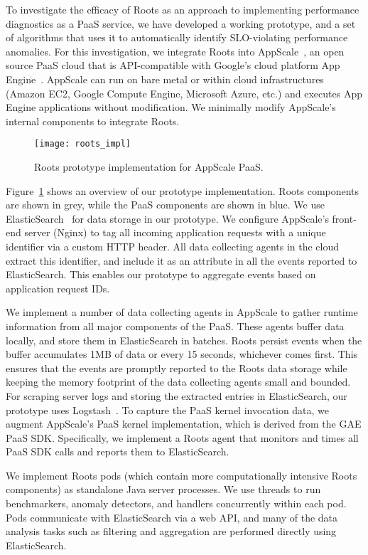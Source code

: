 To investigate the efficacy of Roots as an approach to
implementing performance diagnostics as a PaaS service, we have developed a
working prototype, and a set of algorithms that uses it to automatically
identify SLO-violating performance anomalies.
For this investigation, we integrate Roots into AppScale~\cite{6488671}, an open source PaaS cloud
that is API-compatible with Google's cloud platform App Engine~\cite{gae}.  
AppScale can run on bare metal or within cloud infrastructures (Amazon EC2, Google Compute Engine, 
 Microsoft Azure, etc.) and executes App Engine applications without modification.
We minimally modify AppScale's internal components to integrate Roots.

\begin{figure}
\centering
\texttt{[image: roots\_impl]}
\caption{Roots prototype implementation for AppScale PaaS.}
\label{fig:roots_impl}
\end{figure}

Figure~\ref{fig:roots_impl} shows an overview of our prototype implementation. Roots components
are shown in grey, while the PaaS components are shown in blue.
We use ElasticSearch~\cite{Kononenko:2014:MMR:2597073.2597091} for data storage in our prototype. 
We configure AppScale's front-end server (Nginx) to tag all incoming application requests
with a unique identifier via a custom HTTP header. 
All data collecting agents in the cloud extract this identifier, and include it as an attribute
in all the events reported to ElasticSearch. This enables our prototype to aggregate events based 
on application request IDs.

We implement a number of data collecting agents in AppScale to gather runtime information
from all major components of the PaaS. These agents buffer data locally, and store them in ElasticSearch
in batches. Roots persist events when the buffer accumulates 1MB of data or every 15 seconds, whichever comes
first.  This ensures that the events are promptly reported to the Roots data
storage while keeping the memory footprint of the data collecting agents small and bounded. 
For scraping server logs and storing the extracted entries in ElasticSearch,
our prototype uses Logstash~\cite{logstash}. 
To capture the PaaS kernel invocation data, we augment AppScale's PaaS kernel implementation,
which is derived from the GAE PaaS SDK. Specifically, we implement a Roots agent that monitors
and times all PaaS SDK calls and reports them to ElasticSearch. 

We implement Roots pods (which  contain more computationally intensive Roots components) 
as standalone Java server processes. We use threads to run benchmarkers,
anomaly detectors, and handlers concurrently within each pod. Pods communicate with ElasticSearch via
a web API, and many of the data analysis tasks such as filtering and aggregation are performed
directly using ElasticSearch.

